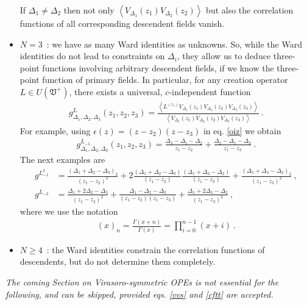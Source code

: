 \documentclass[12pt,a4paper,notitlepage]{report}
\numberwithin{equation}{section}
\theoremstyle{break}
\begin{document}
\begin{itemize}
If $\Delta_1\neq \Delta_2$ then not only $\left\langle V_{\Delta_1}(z_1)V_{\Delta_2}(z_2)\right\rangle$ but also the correlation functions of all corresponding descendent fields vanish. 
\item $\boxed{N=3}$\ : we have as many Ward identities as unknowns.
So, while the Ward identities do not lead to constraints on $\Delta_i$, they allow us to deduce three-point functions involving arbitrary descendent fields, if we know the three-point function of primary fields.
In particular, for any creation operator $L\in U(\mathfrak{V}^+)$, there exists a universal, $c$-independent function
\begin{align}
 g^{L}_{\Delta_1,\Delta_2,\Delta_3}(z_1,z_2,z_3) = \frac{\left\langle L^{(z_1)} V_{\Delta_1}(z_1)V_{\Delta_2}(z_2)V_{\Delta_3}(z_3)\right\rangle}{\left\langle V_{\Delta_1}(z_1)V_{\Delta_2}(z_2)V_{\Delta_3}(z_3)\right\rangle } \ .
\label{lzgz}
\end{align}
For example, using $\epsilon(z)=(z-z_2)(z-z_3)$ in eq. \eqref{oiz} we obtain 
\begin{align}
 g^{L_{-1}}_{\Delta_1,\Delta_2,\Delta_3}(z_1,z_2,z_3) = \frac{\Delta_3-\Delta_1-\Delta_2}{z_1-z_2} +\frac{\Delta_2-\Delta_1-\Delta_3}{z_1-z_3}\ .
\label{glp}
\end{align}
The next examples are 
\begin{align}
 g^{L_{-1}^2} &= \frac{(\Delta_1+\Delta_2-\Delta_3)_2}{(z_1-z_2)^2} + 2\frac{(\Delta_1+\Delta_2-\Delta_3)}{(z_1-z_2)}\frac{(\Delta_1+\Delta_3-\Delta_2)}{(z_1-z_3)} + \frac{(\Delta_1+\Delta_3-\Delta_2)_2}{(z_1-z_3)^2}\ ,
\label{gloo}
\\
 g^{L_{-2}} & = \frac{\Delta_1+2\Delta_2-\Delta_3}{(z_1-z_2)^2} +\frac{\Delta_1-\Delta_2-\Delta_3}{(z_1-z_2)(z_1-z_3)} + \frac{\Delta_1+2\Delta_3-\Delta_2}{(z_1-z_3)^2}\ ,
\label{glt}
\end{align}
where we use the notation
\begin{align}
 (x)_n = \frac{\Gamma(x+n)}{\Gamma(x)} = \prod_{i=0}^{n-1}(x+i)\ .
\label{xn}
\end{align}
\item $\boxed{N\geq 4}$\ : the Ward identities constrain the correlation functions of descendents, but do not determine them completely.
\end{itemize}

\vspace{2mm} 

\textit{The coming Section on Virasoro-symmetric OPEs is not essential for the following, and can be skipped, provided eqs. \eqref{vvs} and \eqref{cftt} are accepted.}
\end{document}
